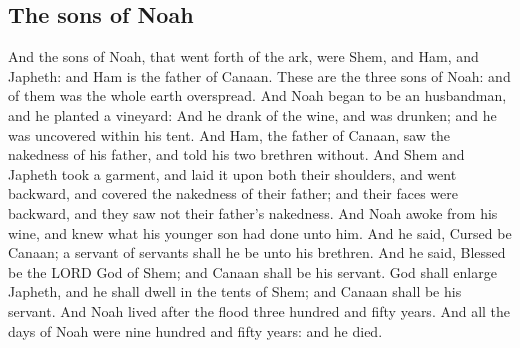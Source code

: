 \begin{biblechapter}
\section*{The sons of Noah}
\verse And the sons of Noah, that went forth of the ark, were Shem, and Ham, and Japheth: and Ham is the father of Canaan.
\verse These are the three sons of Noah: and of them was the whole earth overspread.
\verse And Noah began to be an husbandman, and he planted a vineyard:
\verse And he drank of the wine, and was drunken; and he was uncovered within his tent.
\verse And Ham, the father of Canaan, saw the nakedness of his father, and told his two brethren without.
\verse And Shem and Japheth took a garment, and laid it upon both their shoulders, and went backward, and covered the nakedness of their father; and their faces were backward, and they saw not their father's nakedness.
\verse And Noah awoke from his wine, and knew what his younger son had done unto him.
\verse And he said, Cursed be Canaan; a servant of servants shall he be unto his brethren.
\verse And he said, Blessed be the LORD God of Shem; and Canaan shall be his servant.
\verse God shall enlarge Japheth, and he shall dwell in the tents of Shem; and Canaan shall be his servant.
\verse And Noah lived after the flood three hundred and fifty years.
\verse And all the days of Noah were nine hundred and fifty years: and he died.
\end{biblechapter}

